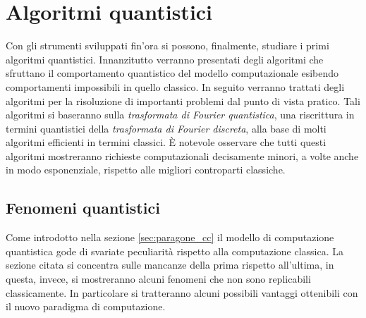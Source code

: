 \chapter{Algoritmi quantistici}\label{chap:algorithms}
Con gli strumenti sviluppati fin'ora si possono, finalmente, studiare i primi algoritmi quantistici.
Innanzitutto verranno presentati degli algoritmi che sfruttano il comportamento quantistico del modello computazionale esibendo comportamenti impossibili in quello classico.
In seguito verranno trattati degli algoritmi per la risoluzione di importanti problemi dal punto di vista pratico.
Tali algoritmi si baseranno sulla \textit{trasformata di Fourier quantistica}, una riscrittura in termini quantistici della \textit{trasformata di Fourier discreta}, alla base di molti algoritmi efficienti in termini classici.
È notevole osservare che tutti questi algoritmi mostreranno richieste computazionali decisamente minori, a volte anche in modo esponenziale, rispetto alle migliori controparti classiche.

\section{Fenomeni quantistici}\label{sec:Quantum_phenomena}
Come introdotto nella sezione \ref{sec:paragone_cc} il modello di computazione quantistica gode di svariate peculiarità rispetto alla computazione classica.
La sezione citata si concentra sulle mancanze della prima rispetto all'ultima, in questa, invece, si mostreranno alcuni fenomeni che non sono replicabili classicamente.
In particolare si tratteranno alcuni possibili vantaggi ottenibili con il nuovo paradigma di computazione.

